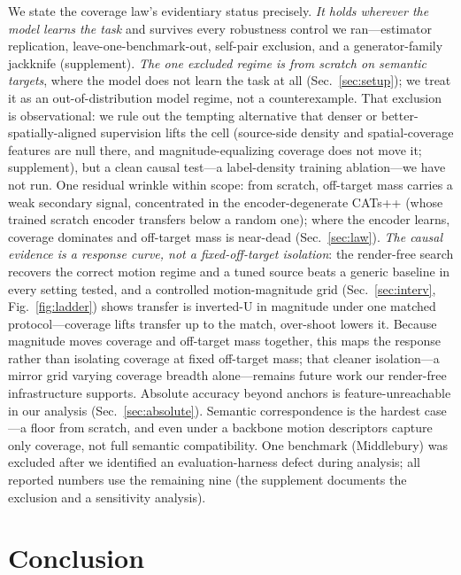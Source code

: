 \documentclass[runningheads]{llncs}
\begin{document}
We state the coverage law's evidentiary status precisely. \emph{It holds
wherever the model learns the task} and survives every robustness control we
ran---estimator replication, leave-one-benchmark-out, self-pair exclusion, and a
generator-family jackknife (supplement). \emph{The one excluded regime is from
scratch on semantic targets}, where the model does not learn the task at all
(Sec.~\ref{sec:setup}); we treat it as an out-of-distribution model regime,
not a counterexample. That exclusion is observational: we rule out the tempting
alternative that denser or better-spatially-aligned supervision lifts the cell
(source-side density and spatial-coverage features are null there, and
magnitude-equalizing coverage does not move it; supplement), but a clean causal
test---a label-density training ablation---we have not run. One residual wrinkle
within scope: from scratch, off-target mass carries a weak secondary signal,
concentrated in the encoder-degenerate CATs++ (whose trained scratch encoder
transfers below a random one); where the encoder learns, coverage dominates and
off-target mass is near-dead (Sec.~\ref{sec:law}). \emph{The causal evidence is a response curve, not a fixed-off-target
isolation}: the render-free search recovers the correct motion regime and a tuned
source beats a generic baseline in every setting tested, and a controlled
motion-magnitude grid (Sec.~\ref{sec:interv}, Fig.~\ref{fig:ladder}) shows
transfer is inverted-U in magnitude under one matched protocol---coverage lifts
transfer up to the match, over-shoot lowers it. Because magnitude moves coverage
and off-target mass together, this maps the response rather than isolating
coverage at fixed off-target mass; that cleaner isolation---a mirror grid varying
coverage breadth alone---remains future work our render-free infrastructure
supports. Absolute accuracy beyond
anchors is feature-unreachable in our analysis (Sec.~\ref{sec:absolute}).
Semantic correspondence is the hardest case---a floor from scratch,
and even under a backbone motion descriptors capture only coverage, not full
semantic compatibility. One benchmark (Middlebury) was excluded after we
identified an evaluation-harness defect during analysis; all reported numbers
use the remaining nine (the supplement documents the exclusion and a
sensitivity analysis).

\section{Conclusion}
\label{sec:conclusion}
\end{document}
